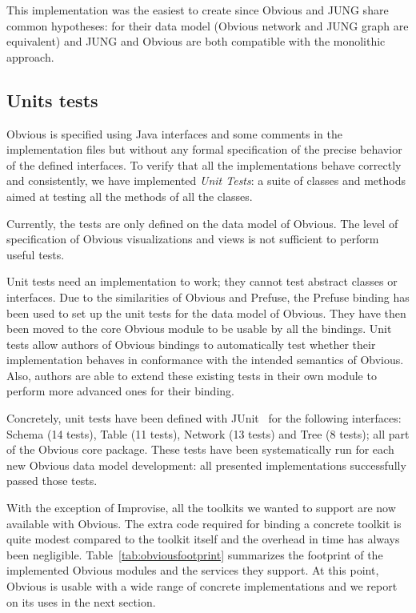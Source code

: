 This implementation was the easiest to create since Obvious and JUNG
share common hypotheses: for their data model (Obvious network and
JUNG graph are equivalent) and JUNG and Obvious are both compatible
with the monolithic approach.  

\subsection{Units tests}
\label{sub:unittests}

Obvious is specified using Java interfaces and some comments in the
implementation files but without any formal specification of the
precise behavior of the defined interfaces.  To verify that all the
implementations behave correctly and consistently, we have implemented
\emph{Unit Tests}: a suite of classes and methods aimed at testing all
the methods of all the classes.

Currently, the tests are only defined on the data model of Obvious.
The level of specification of Obvious visualizations and views is not
sufficient to perform useful tests.

Unit tests need an implementation to work; they cannot test abstract
classes or interfaces.  Due to the similarities of Obvious and
Prefuse, the Prefuse binding has been used to set up the unit tests
for the data model of Obvious.  They have then been moved to the core
Obvious module to be usable by all the bindings.  Unit tests allow
authors of Obvious bindings to automatically test whether their
implementation behaves in conformance with the intended semantics of
Obvious.  Also, authors are able to extend these existing tests in
their own module to perform more advanced ones for their binding.

Concretely, unit tests have been defined with JUnit~\cite{JUnit} for
the following interfaces: Schema (14 tests), Table (11 tests), Network
(13 tests) and Tree (8 tests); all part of the Obvious core package.
These tests have been systematically run for each new Obvious data
model development: all presented implementations successfully passed
those tests.



With the exception of Improvise, all the toolkits we wanted to support
are now available with Obvious.  The extra code required for binding a
concrete toolkit is quite modest compared to the toolkit itself and
the overhead in time has always been negligible.
Table~\ref{tab:obviousfootprint} summarizes the footprint of the
implemented Obvious modules and the services they support.  At this
point, Obvious is usable with a wide range of concrete implementations
and we report on its uses in the next section.

